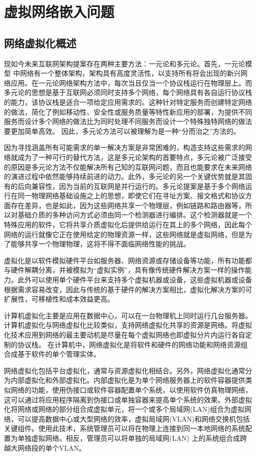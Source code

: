 \chapter{虚拟网络嵌入问题}
\section{网络虚拟化概述}
现如今未来互联网架构提案存在两种主要方法：一元论和多元论。首先，一元论模型 中网络有一个整体架构，架构具有高度灵活性，以支持所有将会出现的新兴网络应用。在一元论网络架构方法中，每次当且仅当一个协议栈运行在物理层上。而多元论的思想是基于互联网必须同时支持多个网络，每个网络具有各自运行协议栈的能力，该协议栈是适合一项给定应用需求的。这种针对特定服务而创建特定网络的做法，简化了例如移动性、安全性或服务质量等特性新应用的部署，为提供不同服务而设计多个网络的做法比为同时处理不同服务而设计一个特殊独特网络的做法要更加简单高效。 因此，多元论方法可以被理解为是一种“分而治之”方法的。

因为寻找涵盖所有可能需求的单一解决方案是非常困难的，构造支持这些需求的网络就成为了一种可行的替代方法，这是多元论架构的首要特点，多元论被广泛接受的原因是多元论方法不仅能解决所有己知的互联网问题，而且也能要求在未来网络的演进过程中依然能够持续前进的动力。此外，多元论的另一个关键优势就是其固有的后向兼容性，因为当前的互联网是并行运行的。多元论提案是基于多个网络运行在同一物理网络基础设施之上的思想，即使它们在寻址方案、报文格式和协议方面存在差异，也是如此，因为这些网络共享一个物理层，例如链路和路由器等，所以对基础介质的多种访问方式必须由同一个检测器进行编排。这个检测器就是一个特殊应用的软件，它将共享介质虚拟化后提供给运行在其上的多个网络，因此每个网络的运行就像它正在使用给定的物理资源一样，这些网络就是虚拟网络，但是为了能够共享一个物理物理，这将不得不面临网络性能的挑战。

虚拟化是以软件模拟硬件平台如服务器、网络资源或存储设备等功能，所有功能都与硬件解耦分离，并被模拟为“虚拟实例”，具有像传统硬件解决方案一样的操作能力。此外可以使用单个硬件平台来支持多个虚拟机器或设备，这些虚拟机器或设备根据需求容易改变，因此与传统的基于硬件的解决方案相比，虚拟化解决方案的可扩展性，可移植性和成本效益更高。

计算机虚拟化主要是应用在数据中心，可以在一台物理机上同时运行几台服务器。计算机虚拟化与网络虚拟化比较类似，支持网络虚拟化共享的资源是网络。将虚拟化技术应用到网络的最主要动机是尽量在每个虚拟网络也即虚拟分片内运行各自定制的协议栈。 在计算机中，网络虚拟化是将软件和硬件的网络功能和网络资源组合成基于软件的单个管理实体。

网络虚拟化包括平台虚拟化，通常与资源虚拟化相结合。另外，网络虚拟化通常分为内部虚拟化和外部虚拟化。内部虚拟化是为单个网络服务器上的软件容器提供类似网络的功能，使用伪接口或软件容器配置单个系统，以使用软件仿真物理网络，这可以通过将应用程序隔离到伪接口或单独容器来提高单个系统的效果。外部虚拟化将网络或网络的部分组合成虚拟单元，将一个或多个局域网(LAN)组合为虚拟网络，可以提高数据中心或大型网络的效率，虚拟局域网(VLAN)和网络交换机包括关键组件。使用此技术，系统管理员可以将在物理上连接到同一本地网络的系统配置为单独虚拟网络。相反，管理员可以将单独的局域网(LAN) 上的系统组合成跨越大网络段的单个VLAN。



